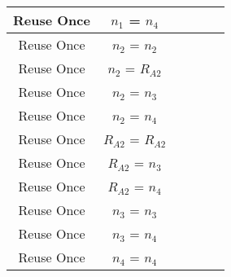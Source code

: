\documentclass[crop]{standalone}
\newcommand{\noattack}{\color{ForestGreen}\usym{2713}\color{black}}
\newcommand{\attack}{\color{red}\usym{2717}\color{black}}
\begin{document}
{\begin{tabular}{|c|c|c|c|c|c|}
Reuse Once & $n_1$ = $n_4$ & \noattack & \noattack & \noattack & \noattack\\ \hline
Reuse Once & $n_2$ = $n_2$ & \attack & \attack & \attack & \attack\\ \hline
Reuse Once & $n_2$ = $R_{A2}$ & \noattack & \noattack & \noattack & \noattack\\ \hline
Reuse Once & $n_2$ = $n_3$ & \noattack & \noattack & \noattack & \noattack\\ \hline
Reuse Once & $n_2$ = $n_4$ & \noattack & \noattack & \noattack & \noattack\\ \hline
Reuse Once & $R_{A2}$ = $R_{A2}$ & \noattack & \noattack & \noattack & \noattack\\ \hline
Reuse Once & $R_{A2}$ = $n_3$ & \noattack & \noattack & \noattack & \noattack\\ \hline
Reuse Once & $R_{A2}$ = $n_4$ & \noattack & \noattack & \noattack & \noattack\\ \hline
Reuse Once & $n_3$ = $n_3$ & \noattack & \noattack & \noattack & \noattack\\ \hline
Reuse Once & $n_3$ = $n_4$ & \noattack & \noattack & \noattack & \noattack\\ \hline
Reuse Once & $n_4$ = $n_4$ & \noattack & \noattack & \noattack & \noattack\\ \hline
\end{tabular}}
\end{document}
